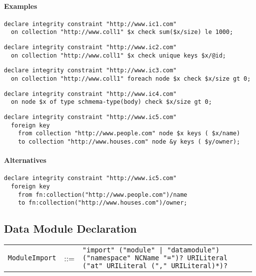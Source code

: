 \documentclass[]{article}
\begin{document}
\paragraph{Examples}
\begin{verbatim}
declare integrity constraint "http://www.ic1.com" 
  on collection "http://www.coll1" $x check sum($x/size) le 1000;
\end{verbatim}

\begin{verbatim}
declare integrity constraint "http://www.ic2.com" 
  on collection "http://www.coll1" $x check unique keys $x/@id;
\end{verbatim}

\begin{verbatim}
declare integrity constraint "http://www.ic3.com" 
  on collection "http://www.coll1" foreach node $x check $x/size gt 0; 
\end{verbatim}

\begin{verbatim}
declare integrity constraint "http://www.ic4.com" 
  on node $x of type schmema-type(body) check $x/size gt 0; 
\end{verbatim}

\begin{verbatim}
declare integrity constraint "http://www.ic5.com" 
  foreign key 
    from collection "http://www.people.com" node $x keys ( $x/name) 
    to collection "http://www.houses.com" node &y keys ( $y/owner);
\end{verbatim}

\paragraph{Alternatives}
\begin{verbatim}
declare integrity constraint "http://www.ic5.com" 
  foreign key 
    from fn:collection("http://www.people.com")/name 
    to fn:collection("http://www.houses.com")/owner;
\end{verbatim}

\subsection{Data Module Declaration}
\begin{tabular}{l c p{12cm}}
{\tt ModuleImport} & ::= & {\tt "import" ("module" | "datamodule") ("namespace" NCName "=")? URILiteral ("at" URILiteral ("," URILiteral)*)? }
\end{tabular}
\end{document}

